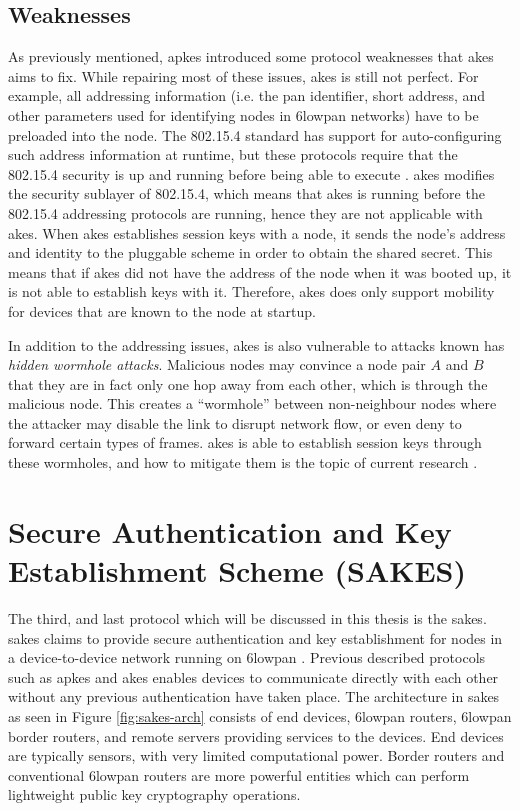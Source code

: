 \subsection{Weaknesses}

As previously mentioned, \gls{apkes} introduced some protocol weaknesses that \gls{akes} aims to fix. While repairing most of these issues, \gls{akes} is still not perfect. For example, all addressing information (i.e. the \gls{pan} identifier, short address, and other parameters used for identifying nodes in \gls{6lowpan} networks) have to be preloaded into the node. The 802.15.4 standard has support for auto-configuring such address information at runtime, but these protocols require that the 802.15.4 security is up and running before being able to execute \cite{krentz2015handling}. \gls{akes} modifies the security sublayer of 802.15.4, which means that \gls{akes} is running before the 802.15.4 addressing protocols are running, hence they are not applicable with \gls{akes}. When \gls{akes} establishes session keys with a node, it sends the node's address and identity to the pluggable scheme in order to obtain the shared secret. This means that if \gls{akes} did not have the address of the node when it was booted up, it is not able to establish keys with it. Therefore, \gls{akes} does only support mobility for devices that are known to the node at startup.

In addition to the addressing issues, \gls{akes} is also vulnerable to attacks known has \emph{hidden wormhole attacks}. Malicious nodes may convince a node pair $A$ and $B$ that they are in fact only one hop away from each other, which is through the malicious node. This creates a ``wormhole'' between non-neighbour nodes where the attacker may disable the link to disrupt network flow, or even deny to forward certain types of frames. \gls{akes} is able to establish session keys through these wormholes, and how to mitigate them is the topic of current research \cite{krentz20146lowpan}. 

\section{Secure Authentication and Key Establishment Scheme (SAKES)}
\label{sec:sakes}

The third, and last protocol which will be discussed in this thesis is the \gls{sakes}. \gls{sakes} claims to provide secure authentication and key establishment for nodes in a device-to-device network running on \gls{6lowpan} \cite{hussen2013sakes}. Previous described protocols such as \gls{apkes} and \gls{akes} enables devices to communicate directly with each other without any previous authentication have taken place. The architecture in \gls{sakes} as seen in Figure \ref{fig:sakes-arch} consists of end devices, \gls{6lowpan} routers, \gls{6lowpan} border routers, and remote servers providing services to the devices. End devices are typically sensors, with very limited computational power. Border routers and conventional \gls{6lowpan} routers are more powerful entities which can perform lightweight public key cryptography operations.


